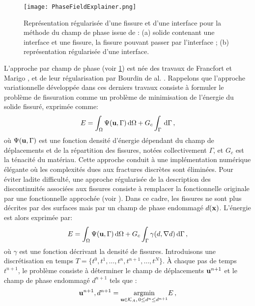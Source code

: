 \begin{figure}[!h]
    \centering
    \texttt{[image: PhaseFieldExplainer.png]}
    \caption{Représentation régularisée d’une fissure et d’une interface pour la méthode du champ de phase issue de \parencite{yvonnet2018fissuration}: (a) solide contenant une interface et une fissure, la fissure pouvant passer par l’interface ; (b) représentation régularisée d’une interface.}
    \label{fig:phasefielexplainer}
\end{figure}

L'approche par champ de phase (voir \cref{fig:phasefielexplainer}) est née des travaux de Francfort et Marigo \parencite{francfort1998revisiting}, et de leur régularisation par Bourdin de al. \parencite{bourdin2008variational}. Rappelons que l’approche variationnelle développée dans ces derniers travaux consiste à formuler le problème de fissuration comme un problème de minimisation de l’énergie du solide fissuré, exprimée comme:
\begin{align}
    E = \int_{\Omega} \Psi(\bvec{u},\Gamma) \diff\Omega + G_c\int_{\Gamma} \diff \Gamma \,,
\end{align}
où $\Psi(\bm{\mathrm{u}},\Gamma)$ est une fonction densité d’énergie dépendant du champ de déplacements et de la répartition des
fissures, notées collectivement $\Gamma$, et $G_c$ est la ténacité du matériau. Cette approche conduit à une implémentation numérique élégante où les complexités dues aux fractures discrètes sont éliminées. Pour éviter ladite difficulté, une approche régularisée de la description
des discontinuités associées aux fissures consiste à remplacer la fonctionnelle originale par une fonctionnelle approchée (voir \parencite{yvonnet2018fissuration}). Dans ce cadre, les fissures ne sont plus décrites par des surfaces mais par un champ de phase endommagé $d(\bm{\mathrm{x}})$. L’énergie est alors exprimée par:
\begin{align}
    E = \int_{\Omega} \Psi(\bvec{u},\Gamma) \diff\Omega + G_c\int_{\Gamma} \gamma(d, \nabla d) \diff \Gamma \,,
\end{align}
où $\gamma$ est une fonction décrivant la densité de fissures. Introduisons une discrétisation en temps $T = \{ t^0, t^1, \ldots, t^n, t^{n+1}, \ldots, t^N \}$. À chaque pas de temps $t^{n+1}$, le problème consiste à déterminer le champ de déplacements $\bm{\mathrm{u}}^{n+1}$ et le champ de phase endommagé $d^{n+1}$ tels que :
\begin{align}
    \bm{\mathrm{u}}^{n+1}, d^{n+1} = \underset{\bm{\mathrm{u}}\in \mathcal{K}_A , \,  0 \leq d^n \leq d^{n+1}}{\text{argmin}} E \,,
\end{align}

